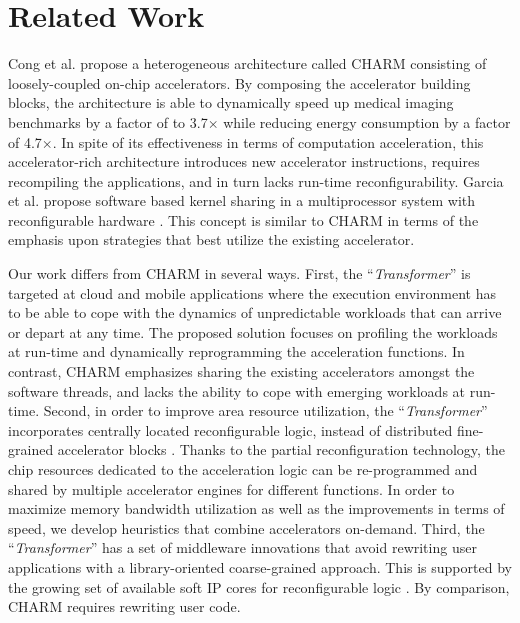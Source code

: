 \section{Related Work}
\label{sec_related}
Cong et al. \cite{accrich,cong-islped12,cong-saw11} propose a
heterogeneous architecture called CHARM consisting of loosely-coupled on-chip
accelerators. By composing the accelerator building blocks, the
architecture is able to dynamically speed up medical imaging benchmarks by a factor of
to 3.7$\times$ while reducing energy consumption by a factor of 4.7$\times$.  In
spite of its effectiveness in terms of computation acceleration, this
accelerator-rich architecture introduces new accelerator instructions,
requires recompiling the applications, and in turn lacks run-time
reconfigurability.  Garcia et al. propose software based kernel sharing in a
multiprocessor system with reconfigurable hardware
	\cite{Garcia:2008iy}. This concept is similar to CHARM in terms of the emphasis upon strategies that best utilize the existing
accelerator.

Our work differs from CHARM \cite{accrich,cong-islped12,cong-saw11} in several ways.
First, the ``{\em Transformer}'' is targeted at cloud and mobile applications
where the execution environment has to be able to cope with the dynamics of
unpredictable workloads that can arrive or depart at any time. The proposed solution
 focuses on profiling the workloads at run-time and dynamically reprogramming
the acceleration functions. In contrast, CHARM 
emphasizes sharing the existing accelerators amongst the software
threads, and lacks the ability to cope with emerging workloads at
run-time. Second, in order to improve area resource utilization, the ``{\em Transformer}'' incorporates 
centrally located reconfigurable logic, instead of distributed fine-grained accelerator blocks
\cite{accrich}. Thanks to the partial reconfiguration technology, the chip
resources dedicated to the acceleration logic can be re-programmed and
shared by multiple accelerator engines for different functions.
In order to maximize memory bandwidth utilization as well as the improvements in terms of speed,
we develop heuristics that combine accelerators on-demand.
Third, the ``{\em Transformer}'' has a set of
middleware innovations that avoid rewriting user applications with a
library-oriented coarse-grained approach. This is supported by the
growing set of available soft IP cores for reconfigurable logic
\cite{opencores,design-reuse,free-ip}. By comparison, CHARM requires
rewriting user code.

